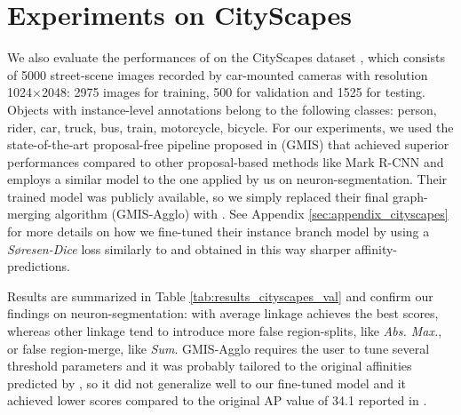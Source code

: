\section{Experiments on CityScapes}\label{sec:cityscapes_exp}
We also evaluate the performances of \algname{} on the CityScapes dataset \cite{cordts2016cityscapes}, which consists of 5000 street-scene images recorded by car-mounted cameras with resolution 1024$\times$2048: 2975 images for training, 500 for validation and 1525 for testing. Objects with instance-level annotations belong to the following classes: person, rider, car, truck, bus, train, motorcycle, bicycle. For our experiments, we used the state-of-the-art proposal-free pipeline proposed in \cite{liu2018affinity} (GMIS) that achieved superior performances compared to other proposal-based methods like Mark R-CNN and employs a similar model to the one applied by us on neuron-segmentation.
Their trained model was publicly available, so we simply replaced their final graph-merging algorithm (GMIS-Agglo) with \algname{}. See Appendix \ref{sec:appendix_cityscapes} for more details on how we fine-tuned their instance branch model by using a \emph{S\o resen-Dice} loss similarly to \cite{wolf2018mutex} and obtained in this way sharper affinity-predictions.

Results are summarized in Table \ref{tab:results_cityscapes_val} and confirm our findings on neuron-segmentation: \algname{} with average linkage achieves the best scores, whereas other linkage tend to introduce more false region-splits, like \emph{Abs. Max.}, or false region-merge, like \emph{Sum}. GMIS-Agglo requires the user to tune several threshold parameters and it was probably tailored to the original affinities predicted by \cite{liu2018affinity}, so it did not generalize well to our fine-tuned model and it achieved lower scores compared to the original AP value of 34.1 reported in \cite{liu2018affinity}.  
